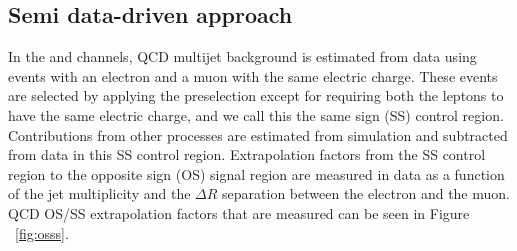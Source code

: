 \subsection{Semi data-driven approach}
In the \Hemu and \Hmue channels, QCD multijet background is estimated from data using events with an electron and a muon with the same electric charge. These events are selected by applying the preselection except for requiring both the leptons to have the same electric charge, and we call this the same sign (SS) control region. Contributions from other processes are estimated from simulation and subtracted from data in this SS control region. Extrapolation factors from the SS control region to the opposite sign (OS) signal region are measured in data as a function of the jet multiplicity and the $\Delta R$ separation between the electron and the muon. QCD OS/SS extrapolation factors that are measured can be seen in Figure ~\ref{fig:osss}.

